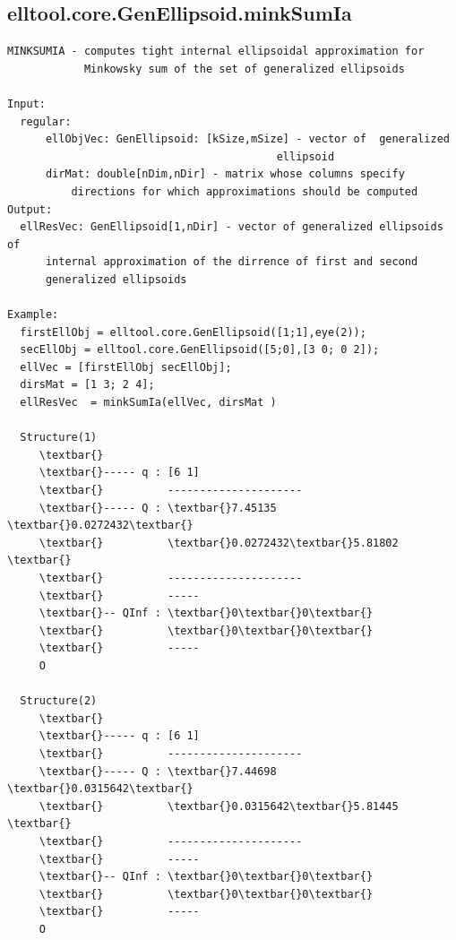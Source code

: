 \documentclass[letterpaper,10pt,english]{sphinxmanual}
\begin{document}
\subsection{elltool.core.GenEllipsoid.minkSumIa}
\label{chap_functions:elltool-core-genellipsoid-minksumia}
\begin{Verbatim}[commandchars=\\\{\}]
MINKSUMIA - computes tight internal ellipsoidal approximation for
            Minkowsky sum of the set of generalized ellipsoids

Input:
  regular:
      ellObjVec: GenEllipsoid: [kSize,mSize] - vector of  generalized
                                          ellipsoid
      dirMat: double[nDim,nDir] - matrix whose columns specify
          directions for which approximations should be computed
Output:
  ellResVec: GenEllipsoid[1,nDir] - vector of generalized ellipsoids of
      internal approximation of the dirrence of first and second
      generalized ellipsoids

Example:
  firstEllObj = elltool.core.GenEllipsoid([1;1],eye(2));
  secEllObj = elltool.core.GenEllipsoid([5;0],[3 0; 0 2]);
  ellVec = [firstEllObj secEllObj];
  dirsMat = [1 3; 2 4];
  ellResVec  = minkSumIa(ellVec, dirsMat )

  Structure(1)
     \textbar{}
     \textbar{}----- q : [6 1]
     \textbar{}          ---------------------
     \textbar{}----- Q : \textbar{}7.45135  \textbar{}0.0272432\textbar{}
     \textbar{}          \textbar{}0.0272432\textbar{}5.81802  \textbar{}
     \textbar{}          ---------------------
     \textbar{}          -----
     \textbar{}-- QInf : \textbar{}0\textbar{}0\textbar{}
     \textbar{}          \textbar{}0\textbar{}0\textbar{}
     \textbar{}          -----
     O

  Structure(2)
     \textbar{}
     \textbar{}----- q : [6 1]
     \textbar{}          ---------------------
     \textbar{}----- Q : \textbar{}7.44698  \textbar{}0.0315642\textbar{}
     \textbar{}          \textbar{}0.0315642\textbar{}5.81445  \textbar{}
     \textbar{}          ---------------------
     \textbar{}          -----
     \textbar{}-- QInf : \textbar{}0\textbar{}0\textbar{}
     \textbar{}          \textbar{}0\textbar{}0\textbar{}
     \textbar{}          -----
     O
\end{Verbatim}
\end{document}
